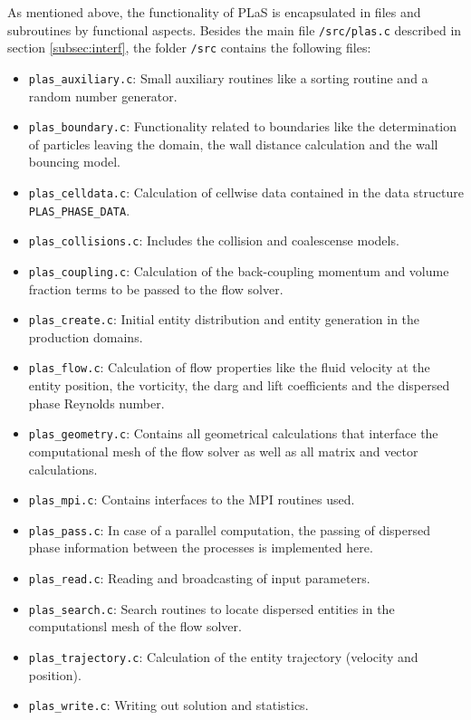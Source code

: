 \documentclass[12pt]{article}
\begin{document}
As mentioned above, the functionality of PLaS is encapsulated in files and subroutines by functional aspects. Besides the main file {\tt{/src/plas.c}} described in section \ref{subsec:interf}, the folder {\tt{/src}} contains the following files:

\begin{itemize}
\item {\tt{plas\_auxiliary.c}}: Small auxiliary routines like a sorting routine and a random number generator.
\item {\tt{plas\_boundary.c}}: Functionality related to boundaries like the determination of particles leaving the domain, the wall distance calculation and the wall bouncing model.
\item {\tt{plas\_celldata.c}}: Calculation of cellwise data contained in the data structure {\tt{PLAS\_PHASE\_DATA}}.
\item {\tt{plas\_collisions.c}}: Includes the collision and coalescense models.
\item {\tt{plas\_coupling.c}}: Calculation of the back-coupling momentum and volume fraction terms to be passed to the flow solver.
\item {\tt{plas\_create.c}}: Initial entity distribution and entity generation in the production domains.
\item {\tt{plas\_flow.c}}: Calculation of flow properties like the fluid velocity at the entity position, the vorticity, the darg and lift coefficients and the dispersed phase Reynolds number.
\item {\tt{plas\_geometry.c}}: Contains all geometrical calculations that interface the computational mesh of the flow solver as well as all matrix and vector calculations.
\item {\tt{plas\_mpi.c}}: Contains interfaces to the MPI routines used.
\item {\tt{plas\_pass.c}}: In case of a parallel computation, the passing of dispersed phase information between the processes is implemented here.
\item {\tt{plas\_read.c}}: Reading and broadcasting of input parameters.
\item {\tt{plas\_search.c}}: Search routines to locate dispersed entities in the computationsl mesh of the flow solver.
\item {\tt{plas\_trajectory.c}}: Calculation of the entity trajectory (velocity and position).
\item {\tt{plas\_write.c}}: Writing out solution and statistics.
\end{itemize}
\end{document}
